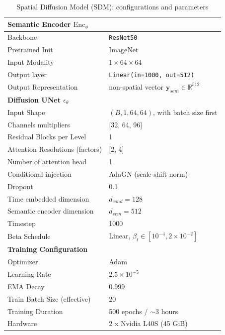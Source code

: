 \begin{table}[h]
\captionsetup{justification=raggedright,singlelinecheck=false}
\caption{Spatial Diffusion Model (SDM): configurations and parameters}

\begin{adjustbox}{max width=0.9\textwidth}
    \begin{tabular}{ll}
    \toprule
    \multicolumn{2}{l}{\textbf{Semantic Encoder $\mathrm{Enc}_{\phi}$}} \\
    \midrule
    Backbone & \texttt{ResNet50}\cite{ResNet50} \\
    Pretrained Init & ImageNet \\
    Input Modality & $1 \times 64 \times 64 $ \\
    Output layer & \texttt{Linear(in=1000, out=512)} \\
    Output Representation & non-spatial vector $\mathbf{y}_{sem} \in \mathbb{R}^{512}$ \\
    \midrule
    \multicolumn{2}{l}{\textbf{Diffusion UNet $\epsilon_{\theta}$}} \\
    \midrule
    Input Shape & $(B, 1, 64, 64)$, with batch size first \\
    Channels multipliers & [32, 64, 96] \\
    Residual Blocks per Level & 1 \\
    Attention Resolutions (factors) & [2, 4] \\
    Number of attention head & 1 \\
    Conditional injection & AdaGN (scale-shift norm) \\
    Dropout & 0.1 \\
    Time embedded dimension & $d_{cond} = 128$ \\
    Semantic encoder dimension & $d_{sem}=512$ \\
    Timestep & 1000 \\
    Beta Schedule & Linear, $\beta_t \in [10^{-4}, 2 \times 10^{-2}]$ \\
    \midrule
    \multicolumn{2}{l}{\textbf{Training Configuration}} \\
    \midrule
    Optimizer & Adam \\
    Learning Rate & $2.5 \times 10^{-5}$ \\
    EMA Decay & 0.999 \\
    Train Batch Size (effective) & 20 \\
    Training Duration & 500 epochs / $\sim$3 hours \\
    Hardware & 2 x Nvidia L40S (45 GiB) \\
    \bottomrule
    \end{tabular}
\end{adjustbox}
\label{tab:sdm-config}
\end{table}

